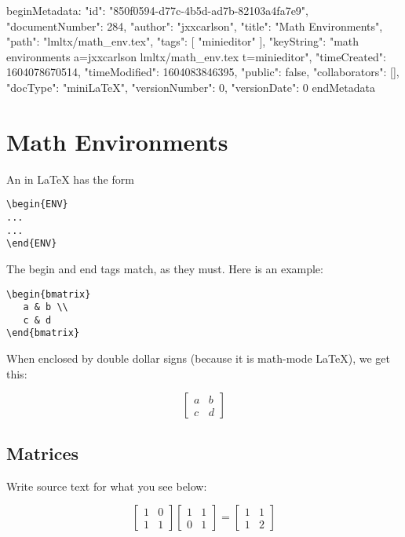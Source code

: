 beginMetadata:
{
    "id": "850f0594-d77c-4b5d-ad7b-82103a4fa7e9",
    "documentNumber": 284,
    "author": "jxxcarlson",
    "title": "Math Environments",
    "path": "lmltx/math_env.tex",
    "tags": [
        "minieditor"
    ],
    "keyString": "math environments a=jxxcarlson lmltx/math_env.tex t=minieditor",
    "timeCreated": 1604078670514,
    "timeModified": 1604083846395,
    "public": false,
    "collaborators": [],
    "docType": "miniLaTeX",
    "versionNumber": 0,
    "versionDate": 0
}
endMetadata


\setcounter{section}{2}

\section{Math Environments}

\innertableofcontents

An  in LaTeX has the form

\begin{verbatim}
\begin{ENV}
...
...
\end{ENV}
\end{verbatim}

The begin and end tags match, as they must.   Here is an example:

\begin{verbatim}
\begin{bmatrix}
   a & b \\
   c & d
\end{bmatrix}
\end{verbatim}

When enclosed by double dollar signs (because it is math-mode LaTeX), we get this:

$$
\begin{bmatrix}
   a & b \\
   c & d
\end{bmatrix}
$$

\subsection{Matrices}

 Write source text for what you see below:

$$
\begin{bmatrix}
   1 & 0 \\
   1 & 1
\end{bmatrix}
\begin{bmatrix}
   1 & 1 \\
   0 & 1
\end{bmatrix}
=
\begin{bmatrix}
   1 & 1 \\
   1 & 2
\end{bmatrix}
$$

